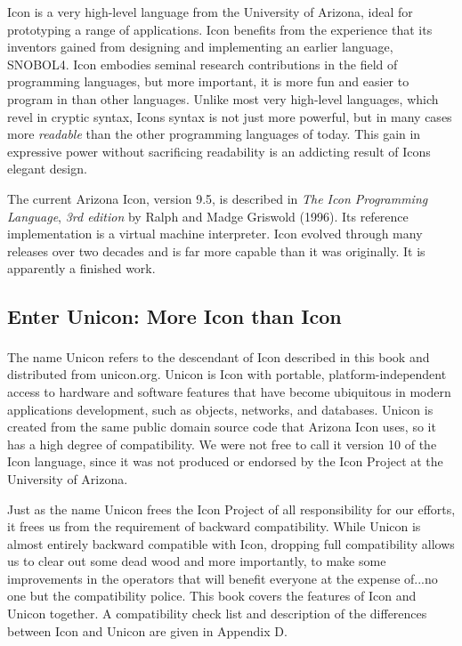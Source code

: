 Icon is a very high-level language from
the University of Arizona, ideal for prototyping a
range of applications. Icon benefits from the experience that its
inventors gained from designing and implementing
an earlier language, SNOBOL4. Icon
embodies seminal research contributions in the field of
programming languages, but more important, it is more fun and
easier to program in than other languages. Unlike most very high-level
languages, which revel in cryptic syntax, Icon{\textquotesingle}s
syntax is not just more powerful, but in many cases more
\textit{readable} than the other programming languages of today. This
gain in expressive power without sacrificing readability is an
addicting result of Icon{\textquotesingle}s elegant design.

The current Arizona Icon, version 9.5, is described in
\textit{The Icon Programming Language}, \textit{3rd edition} by Ralph
and Madge Griswold (1996). Its reference implementation is a
virtual machine interpreter. Icon evolved through many releases
over two decades and is far more capable than it was originally. It is
apparently a finished work.

\subsection{Enter Unicon: More Icon than Icon}

The name Unicon\textbf{\textsuperscript{ }}refers to the descendant of
Icon described in this book and distributed from unicon.org. Unicon is
Icon with portable, platform-independent access to hardware and
software features that have become ubiquitous in modern
applications development, such as objects, networks, and databases.
Unicon is created from the same public domain source code that Arizona
Icon uses, so it has a high degree of compatibility. We were not
free to call it version 10 of the Icon
language, since it was not produced or endorsed by the Icon Project at
the University of Arizona.

Just as the name Unicon frees the Icon Project of all responsibility for
our efforts, it frees us from the requirement of backward
compatibility. While Unicon is almost entirely backward compatible
with Icon, dropping full
compatibility allows us to clear out some dead wood and more
importantly, to make some improvements in the operators that will
benefit everyone at the expense of...no one but the compatibility
police.
This book covers the features of Icon and Unicon together. A
compatibility check list and description of the differences
between Icon and Unicon are given in Appendix D.

